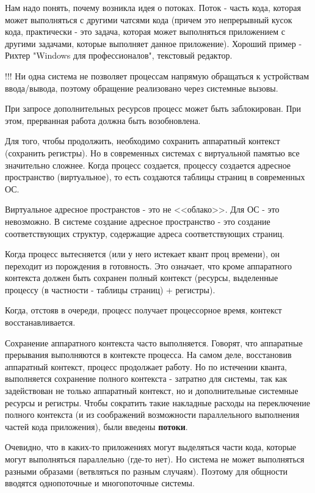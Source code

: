 \documentclass[a4paper, 12pt]{report}
\begin{document}
	Нам надо понять, почему возникла идея о потоках. Поток - часть кода, которая может выполняться с другими чатсями кода (причем это непрерывный кусок кода, практически - это задача, которая может выполняться приложением с другими задачами, которые выполняет данное приложение). Хороший пример - Рихтер "Windows для профессионалов", текстовый редактор.
	
	!!! Ни одна система не позволяет процессам напрямую обращаться к устройствам ввода/вывода, поэтому обращение реализовано через системные вызовы.
	
	При запросе дополнительных ресурсов процесс может быть заблокирован. При этом, прерванная работа должна быть возобновлена.
	
	Для того, чтобы продолжить, необходимо сохранить аппаратный контекст (сохранить регистры). Но в современных системах с виртуальной памятью все значительно сложнее. Когда процесс создается, процессу создается адресное пространство (виртуальное), то есть создаются таблицы страниц в современных ОС.
	
	Виртуальное адресное пространстов - это не <<облако>>. Для ОС - это невозможно. В системе создание адресное пространство - это создание соответствующих структур, содержащие адреса соответствующих страниц.
	
	Когда процесс вытесняется (или у него истекает квант проц времени), он переходит из порождения в готовность. Это означает, что кроме аппаратного контекста должен быть сохранен полный контекст (ресурсы, выделенные процессу (в частности - таблицы страниц) + регистры).
	
	Когда, отстояв в очереди, процесс получает процессорное время, контекст восстанавливается.
	
	Сохранение аппаратного контекста часто выполняется. Говорят, что аппаратные прерывания выполняются в контексте процесса. На самом деле, восстановив аппаратный контекст, процесс продолжает работу. Но по истечении кванта, выполняется сохранение полного контекста - затратно для системы, так как задействован не только аппаратный контекст, но и дополнительные системные ресурсы и регистры. Чтобы сократить такие накладные расходы на переключение полного контекста (и из соображений возможности параллельного выполнения частей кода приложения), были введены {\bf потоки}.
	
	Очевидно, что в каких-то приложениях могут выделяться части кода, которые могут выполняться параллельно (где-то нет). Но система не может выполняться разными образами (ветвляться по разным случаям). Поэтому для общности вводятся однопоточные и многопоточные системы.
	
\end{document}
